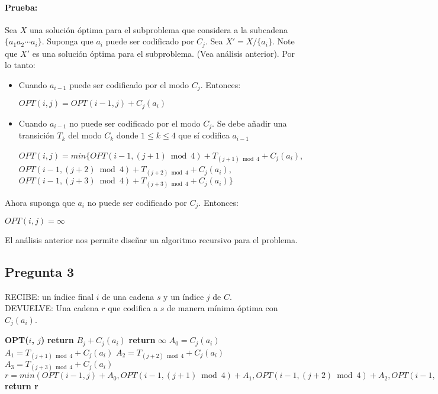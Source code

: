 \paragraph{Prueba:}
Sea $X$ una solución óptima para el subproblema que considera a la subcadena $\{a_1a_2 \cdots a_{i}\}$.
Suponga que $a_i$ puede ser codificado por $C_j$. Sea $X' = X / \{a_i\}$. Note que $X'$ es una solución óptima para el
subproblema. (Vea análisis anterior). Por lo tanto:

\begin{itemize}
    \item Cuando $a_{i-1}$ puede ser codificado por el modo $C_j$. Entonces:
    \begin{center}
        $OPT(i,j) = OPT(i-1, j) + C_j(a_i)$
    \end{center}
    \item Cuando $a_{i-1}$ no puede ser codificado por el modo $C_j$. Se debe añadir una transición $T_k$ del modo
    $C_k$ donde $ 1 \leq k \leq 4$ que sí codifica $a_{i-1}$
    \begin{center}
        $ OPT(i,j) = min\{OPT(i - 1, (j+1) \bmod{4}) + T_{(j+1) \bmod{4}} + C_j(a_i)$, \\
        $OPT(i - 1, (j+2) \bmod{4}) + T_{(j+2) \bmod{4}} +C_j(a_i)$, \\ 
        $OPT(i - 1, (j+3) \bmod{4}) + T_{(j+3) \bmod{4}} + C_j(a_i)\}$
    \end{center}
\end{itemize}

Ahora suponga que $a_i$ no puede ser codificado por $C_j$. Entonces:
\begin{center}
    $OPT(i,j) = \infty$
\end{center}

El análisis anterior nos permite diseñar un algoritmo recursivo para el problema.

\newpage 

\subsection{Pregunta 3}

\noindent RECIBE: un índice final $i$ de una cadena $s$ y un índice $j$ de $C$.\\
DEVUELVE: Una cadena $r$ que codifica a $s$ de manera mínima óptima con $C_j(a_i)$.

\begin{algorithmic}[1]
\item[]{\textbf{OPT($i$, $j$)}}
\State \textbf{return} $B_j + C_j(a_i)$
\EndIf
{}
\State \textbf{return} $\infty$
\EndIf
\State $A_0 = C_j(a_i)$
\State $A_1 = T_{(j+1)\bmod{4}} + C_j(a_i)$
\State $A_2 = T_{(j+2)\bmod{4}} + C_j(a_i)$
\State $A_3 = T_{(j+3)\bmod{4}} + C_j(a_i)$
\State $r=min(OPT(i-1,j) + A_0, OPT(i-1,(j+1)\bmod{4}) + A_1, OPT(i-1,(j+2)\bmod{4}) + A_2, OPT(i-1,(j+3)\bmod{4}) + A_3)$
\State \textbf{return r} 
\end{algorithmic}

